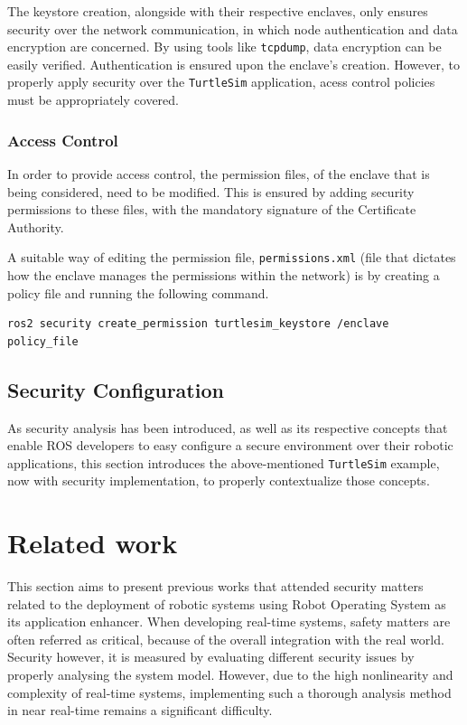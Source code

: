 The keystore creation, alongside with their respective enclaves, only ensures security over the network communication, in which node authentication and data encryption are concerned. By using tools like \texttt{tcpdump}, data encryption can be easily verified. Authentication is ensured upon the enclave's creation. However, to properly apply security over the \texttt{TurtleSim} application, acess control policies must be appropriately covered.

\subsubsection{Access Control}
            
In order to provide access control, the permission files, of the enclave that is being considered, need to be modified. This is ensured by adding security permissions to these files, with the mandatory signature of the Certificate Authority. 
                
A suitable way of editing the permission file, \texttt{permissions.xml} (file that dictates how the enclave manages the permissions within the network) is by creating a policy file and running the following command.
                
\begin{lstlisting}[title={Setting permissions into an enclave.}]
ros2 security create_permission turtlesim_keystore /enclave policy_file
\end{lstlisting}

\subsection{Security Configuration}

As security analysis has been introduced, as well as its respective concepts that enable ROS developers to easy configure a secure environment over their robotic applications, this section introduces the above-mentioned \texttt{TurtleSim} example, now with security implementation, to properly contextualize those concepts.


\section{Related work}\label{s:ros-relWork}

This section aims to present previous works that attended security matters related to the deployment of robotic systems using Robot Operating System as its application enhancer. When developing real-time systems, safety matters are often referred as critical, because of the overall integration with the real world. Security however, it is measured by evaluating different security issues by properly analysing the system model. However, due to the high nonlinearity and complexity of real-time systems, implementing such a thorough analysis method in near real-time remains a significant difficulty. \cite{diao2009design}

